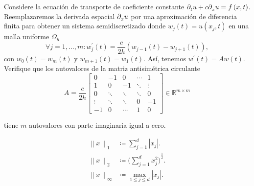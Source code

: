 \documentclass[aspectratio=1610,spanish,8pt]{beamer}
\begin{document}
\begin{frame}
    \frametitle{\secname}

    Considere la ecuación de transporte de coeficiente constante
    \begin{math}
        \difcp{u}{t}+
        c\difcp{u}{x}=
        f\left(x,t\right)
    \end{math}.
    Reemplazaremos la derivada espacial $\difcp{u}{x}$ por una
    aproximación de diferencia finita para obtener un sistema
    semidiscretizado donde $w_{j}\left(t\right)=u\left(x_{j},t\right)$
    en una malla uniforme $\Omega_{h}$
    \begin{equation*}
        \forall j=1,\dotsc,m:
        w^{\prime}_{j}\left(t\right)=
        \dfrac{c}{2h}
        \left(
        w_{j-1}\left(t\right)-
        w_{j+1}\left(t\right)
        \right),
    \end{equation*}
    con
    \begin{math}
        w_{0}\left(t\right)=
        w_{m}\left(t\right)
    \end{math}
    y
    \begin{math}
        w_{m+1}\left(t\right)=
        w_{1}\left(t\right)
    \end{math}.
    Así, tenemos
    \begin{math}
        w^{\prime}\left(t\right)=Aw\left(t\right)
    \end{math}.
    Verifique que los autovalores de la matriz antisimétrica
    circulante
    \begin{equation*}
        A=
        \frac{c}{2h}
        \begin{bmatrix}
            0      & -1     & 0      & \cdots & 1      \\
            1      & 0      & -1     & \ddots & \vdots \\
            0      & \ddots & \ddots & \ddots & 0      \\
            \vdots & \ddots & \ddots & 0      & -1     \\
            -1     & 0      & \cdots & 1      & 0
        \end{bmatrix}\in\mathbb{R}^{m\times m}
    \end{equation*}

    tiene $m$ autovalores con parte imaginaria igual a cero.
\end{frame}

\begin{frame}
    \begin{definition}
        \begin{align*}
            \left\|x\right\|_{1}      & \coloneqq
            \sum_{j=1}^{d}\left|x_{j}\right|.                  \\
            \left\|x\right\|_{2}      & \coloneqq
            {\Big(\sum_{j=1}^{d}x^{2}_{j}\Big)}^{\frac{1}{2}}. \\
            \left\|x\right\|_{\infty} & \coloneqq
            \max_{1\leq j\leq d}\left|x_{j}\right|.            \\
        \end{align*}
    \end{definition}
\end{frame}
\end{document}
